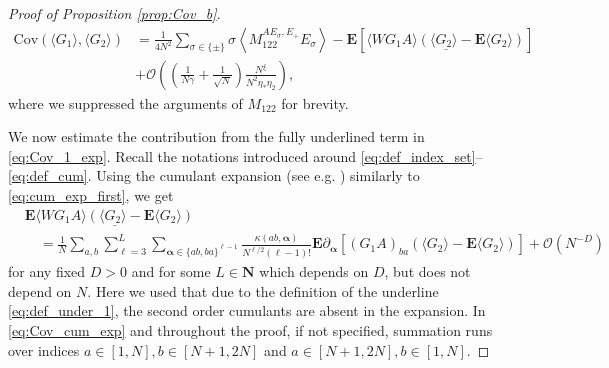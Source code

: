 \documentclass[10pt]{amsart}
\numberwithin{equation}{section}
\newcommand{\E}{\mathbf{E}}
\newcommand{\N}{\mathbf{N}}
\newcommand{\Cov}{\mathrm{Cov}}
\begin{document}
\begin{proof}[Proof of Proposition \ref{prop:Cov_b}]
\begin{equation}
\begin{split}
\Cov\left(\langle G_1\rangle,\langle G_2\rangle\right) &=\frac{1}{4N^2}\sum_{\sigma\in\{\pm\}} \sigma\left\langle M_{122}^{AE_\sigma,E_+}E_\sigma\right\rangle -\E \left[\underline{ \langle WG_1A\rangle \left(\langle G_2\rangle - \E\langle G_2\rangle\right)}\right]\\
&+\mathcal{O}\left(\left(\frac{1}{N\gamma}+\frac{1}{\sqrt{N}}\right)\frac{N^\xi}{N^2\eta_*\eta_2}\right),
\label{eq:Cov_1_exp}
\end{split}
\end{equation}
where we suppressed the arguments of $M_{122}$ for brevity.

We now estimate the contribution from the fully underlined term in \eqref{eq:Cov_1_exp}. Recall the notations introduced around \eqref{eq:def_index_set}--\eqref{eq:def_cum}. Using the cumulant expansion (see e.g. \cite[Lemma 3.2]{Knowles20}) similarly to \eqref{eq:cum_exp_first}, we get
\begin{equation}
\begin{split}
&\E\underline{\langle WG_1A\rangle\left(\langle G_2\rangle - \E\langle G_2\rangle\right)}\\
&\quad = \frac{1}{N}\sum_{a,b}\sum_{\ell=3}^L\sum_{\bm{\alpha}\in\{ab,ba\}^{\ell-1}}\frac{\kappa(ab,\bm{\alpha})}{N^{\ell/2}(\ell-1)!}\E\partial_{\bm{\alpha}}\left[ \left(G_1A\right)_{ba}\left(\langle G_2\rangle - \E\langle G_2\rangle\right)\right] + \mathcal{O}(N^{-D})
\end{split}
\label{eq:Cov_cum_exp}
\end{equation}
for any fixed $D>0$ and for some $L\in\N$ which depends on $D$, but does not depend on $N$. Here we used that due to the definition of the underline \eqref{eq:def_under_1}, the second order cumulants are absent in the expansion. In \eqref{eq:Cov_cum_exp} and throughout the proof, if not specified, summation runs over indices $a\in [1,N], b\in [N+1,2N]$ and $a\in [N+1,2N], b\in [1,N]$.


\end{proof}
\end{document}
